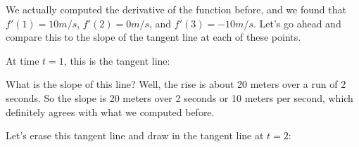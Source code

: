 \documentclass[pdftex, brazil, 12pt, twoside]{article}
\begin{document}
We actually computed the derivative of the function
before, and we found that $f'(1) = 10 m/s$, $f'(2) = 0 m/s$,
and $f'(3) = -10 m/s$.
Let's go ahead and compare this to the slope
of the tangent line at each of these points.

At time $t = 1$, this is the tangent line:

\begin{figure}[H]
  \begin{center}
  \end{center}
\end{figure}

What is the slope of this line?
Well, the rise is about 20 meters over a run of 2 seconds.
So the slope is 20 meters over 2 seconds or 10 meters
per second, which definitely agrees
with what we computed before.

Let's erase this tangent line and draw in the tangent line
at $t=2$:

\begin{figure}[H]
  \begin{center}
  \end{center}
\end{figure}
\end{document}
